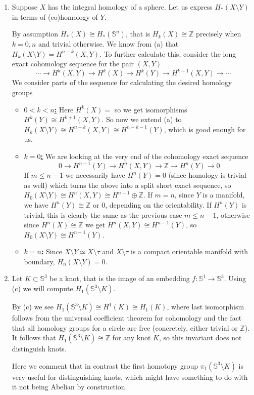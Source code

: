 \documentclass[a4paper, 12pt]{article}
\renewcommand{\S}{\mathbb{S}}
\newcommand{\Z}{\mathbb{Z}}
\newcommand{\iso}{\cong}
\newcommand{\htpeq}{\simeq}
\begin{document}
\begin{enumerate}[label=(\alph*)]
	\item Suppose $X$ has the integral homology of a sphere. Let us express $H_*(X \setminus Y)$ in terms of (co)homology of $Y$.
	
	By assumption $H_*(X) \iso H_*(\S^n)$, that is $H_k(X) \iso \Z$ precisely when $k = 0, n$ and trivial otherwise. We know from (a) that $H_k(X \setminus Y) = H^{n-k}(X, Y)$. To further calculate this, consider the long exact cohomology sequence for the pair $(X, Y)$
	\[
	\cdots \xrightarrow{} H^{k}(X, Y) \xrightarrow{} H^{k}(X) \xrightarrow{} H^{k}(Y) \xrightarrow{} H^{k+1}(X, Y) \xrightarrow{} \cdots
	\]
	We consider parts of the sequence for calculating the desired homology groups
	\begin{itemize}
		\item \underline{\textbf{$0 < k < n$:}} Here $H^{k}(X) = $ so we get isomorphisms $H^{k}(Y) \iso H^{k+1}(X, Y)$. So now we extend (a) to $H_k(X \setminus Y) \iso H^{n-k}(X, Y) \iso H^{n-k-1}(Y)$, which is good enough for us.
		\item \underline{\textbf{$k = 0$:}} We are looking at the very end of the cohomology exact sequence
		\[
		0 \xrightarrow{}H^{n-1}(Y) \xrightarrow{} H^{n}(X, Y) \xrightarrow{} \Z \xrightarrow{} H^{n}(Y) \xrightarrow{} 0
		\]
		If $m \leq n-1$ we necessarily have $H^{n}(Y) = 0$ (since homology is trivial as well) which turns the above into a split short exact sequence, so $H_0(X \setminus Y) \iso H^{n}(X, Y) \iso H^{n-1}\oplus\Z$. If $m = n$, since $Y$ is a manifold, we have $H^{n}(Y) \iso \Z$ or $0$, depending on the orientability. If $H^{n}(Y)$ is trivial, this is clearly the same as the previous case $m \leq n-1$, otherwise since $H^{n}(X) \iso \Z$ we get $H^{n}(X, Y) \iso H^{n-1}(Y)$, so $H_0(X \setminus Y) \iso H^{n-1}(Y)$.
		\item \underline{\textbf{$k = n$:}} Since $X \setminus Y \htpeq X \setminus \tau$ and $X \setminus \tau$ is a compact orientable manifold with boundary, $H_n(X \setminus Y) =0$.
	\end{itemize}
	
	\item Let $K \subset \S^3$ be a knot, that is the image of an embedding $f \colon \S^1 \to \S^3$. Using (c) we will compute $H_1(\S^3 \setminus K)$.
	
	By (c) we see $H_1(\S^3 \setminus K) \iso H^{1}(K) \iso H_1(K)$, where last isomorphism follows from the universal coefficient theorem for cohomology and the fact that all homology groups for a circle are free (concretely, either trivial or $\Z$). It follows that $H_1(\S^3\setminus K) \iso \Z$ for any knot $K$, so this invariant does not distinguish knots.
	
	Here we comment that in contrast the first homotopy group $\pi_1(\S^3 \setminus K)$ is very useful for distinguishing knots, which might have something to do with it not being Abelian by construction.
\end{enumerate}
\end{document}

